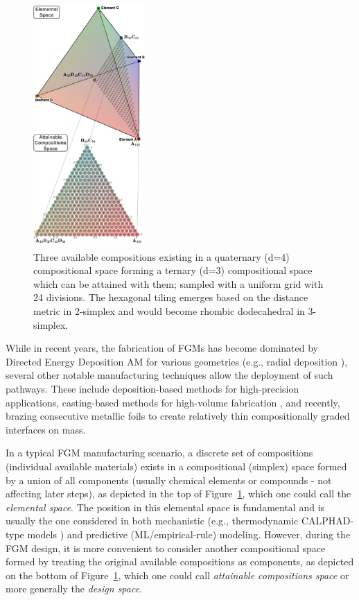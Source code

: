 \begin{figure}[H]
    \centering
    \includegraphics[width=0.38\textwidth]{nimplex/Spaces.jpeg}
    \caption{Three available compositions existing in a quaternary (d=4) compositional space forming a ternary (d=3) compositional space which can be attained with them; sampled with a uniform grid with 24 divisions. The hexagonal tiling emerges based on the distance metric in 2-simplex and would become rhombic dodecahedral in 3-simplex.} 
    \label{nimplex:fig:fgmspaces}
\end{figure}

While in recent years, the fabrication of FGMs has become dominated by Directed Energy Deposition AM for various geometries (e.g., radial deposition \cite{Hofmann2014DevelopingManufacturing}), several other notable manufacturing techniques allow the deployment of such pathways. These include deposition-based methods for high-precision applications, casting-based methods for high-volume fabrication \cite{Saleh202030Challenges}, and recently, brazing consecutive metallic foils \cite{Wu2023ATechnology} to create relatively thin compositionally graded interfaces on mass.

In a typical FGM manufacturing scenario, a discrete set of compositions (individual available materials) exists in a compositional (simplex) space formed by a union of all components (usually chemical elements or compounds - not affecting later steps), as depicted in the top of Figure~\ref{nimplex:fig:fgmspaces}, which one could call the \emph{elemental space}. The position in this elemental space is fundamental and is usually the one considered in both mechanistic (e.g., thermodynamic CALPHAD-type models \cite{Olson2023GenomicDynamics}) and predictive (ML/empirical-rule) modeling. However, during the FGM design, it is more convenient to consider another compositional space formed by treating the original available compositions as components, as depicted on the bottom of Figure~\ref{nimplex:fig:fgmspaces}, which one could call \emph{attainable compositions space} or more generally the \emph{design space}.


